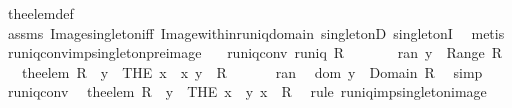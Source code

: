 \begin{isabellebody}
%
\isadelimproof
%
\endisadelimproof
%
\isatagproof
{}\isamarkupfalse%
\ the{\isacharunderscore}elem{\isacharunderscore}def\isanewline
{}\isamarkupfalse%
\ assms\ Image{\isacharunderscore}singleton{\isacharunderscore}iff\ Image{\isacharunderscore}within{\isacharunderscore}runiq{\isacharunderscore}domain\ singletonD\ singletonI\ \isamarkupfalse%
\ {\isacharparenleft}metis{\isacharparenright}%
\endisatagproof
{\isafoldproof}%
%
\isadelimproof
\isanewline
%
\endisadelimproof
\isanewline
{}\isamarkupfalse%
\ runiq{\isacharunderscore}conv{\isacharunderscore}imp{\isacharunderscore}singleton{\isacharunderscore}preimage{\isacharprime}{\isacharcolon}\isanewline
\ \ \ runiq{\isacharunderscore}conv{\isacharcolon}\ {\isachardoublequoteopen}runiq\ {\isacharparenleft}R{\isasyminverse}{\isacharparenright}{\isachardoublequoteclose}\isanewline
\ \ \ \ \ \ \ ran{\isacharcolon}\ {\isachardoublequoteopen}y\ {\isasymin}\ Range\ R{\isachardoublequoteclose}\isanewline
\ \ \ {\isachardoublequoteopen}the{\isacharunderscore}elem\ {\isacharparenleft}{\isacharparenleft}R{\isasyminverse}{\isacharparenright}\ {\isacharbackquote}{\isacharbackquote}\ {\isacharbraceleft}y{\isacharbraceright}{\isacharparenright}\ {\isacharequal}\ {\isacharparenleft}THE\ x\ {\isachardot}\ {\isacharparenleft}x{\isacharcomma}\ y{\isacharparenright}\ {\isasymin}\ R{\isacharparenright}{\isachardoublequoteclose}\ \isanewline
%
\isadelimproof
\isanewline
%
\endisadelimproof
%
\isatagproof
{}\isamarkupfalse%
\ {\isacharminus}\isanewline
\ \ \isamarkupfalse%
\ ran\ \isamarkupfalse%
\ dom{\isacharcolon}\ {\isachardoublequoteopen}y\ {\isasymin}\ Domain\ {\isacharparenleft}R{\isasyminverse}{\isacharparenright}{\isachardoublequoteclose}\ \isamarkupfalse%
\ simp\isanewline
\ \ \isamarkupfalse%
\ runiq{\isacharunderscore}conv\ \isamarkupfalse%
\ {\isachardoublequoteopen}the{\isacharunderscore}elem\ {\isacharparenleft}{\isacharparenleft}R{\isasyminverse}{\isacharparenright}\ {\isacharbackquote}{\isacharbackquote}\ {\isacharbraceleft}y{\isacharbraceright}{\isacharparenright}\ {\isacharequal}\ {\isacharparenleft}THE\ x\ {\isachardot}\ {\isacharparenleft}y{\isacharcomma}\ x{\isacharparenright}\ {\isasymin}\ {\isacharparenleft}R{\isasyminverse}{\isacharparenright}{\isacharparenright}{\isachardoublequoteclose}\ \isamarkupfalse%
\ {\isacharparenleft}rule\ runiq{\isacharunderscore}imp{\isacharunderscore}singleton{\isacharunderscore}image{\isacharprime}{\isacharparenright}\isanewline

\end{isabellebody}
